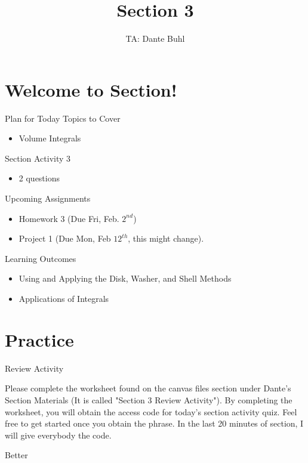 \documentclass{beamer}
\title{Section 3}
\author{TA: Dante Buhl}
\institute{UCSC Math-19B}
\begin{document}
\newcommand{\bmp}[1]{\begin{minipage}{#1\textwidth}}
\newcommand{\emp}{\end{minipage}}


\frame{\titlepage}

\section{Welcome to Section!}
\begin{frame}{Plan for Today}
    Topics to Cover
    \begin{itemize}
        \item Volume Integrals
    \end{itemize}
    Section Activity 3
    \begin{itemize}
        \item 2 questions
    \end{itemize}
    Upcoming Assignments
    \begin{itemize}
        \item Homework 3 (Due Fri, Feb. $2^{nd}$)
        \item Project 1 (Due Mon, Feb $12^{th}$, this might change).
    \end{itemize}
\end{frame}



\begin{frame}{Learning Outcomes}
    \begin{itemize}
        \item Using and Applying the Disk, Washer, and Shell Methods
        \item Applications of Integrals
    \end{itemize}
\end{frame}

\section{Practice}
\begin{frame}{Review Activity}
    \raggedright
    Please complete the worksheet found on the canvas files section under Dante's Section Materials (It is called "Section 3 Review Activity"). By completing the worksheet, you will obtain the access code for today's section activity quiz. Feel free to get started once you obtain the phrase. In the last 20 minutes of section, I will give everybody the code. 
\end{frame}

\begin{frame}

Better

\end{frame}
\end{document}
